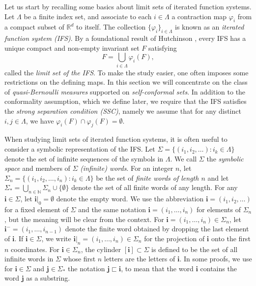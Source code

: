 \documentclass{PRM}
\newcommand{\field}[1]{\mathbb{#1}}
\newcommand{\N}{\field{N}}
\newcommand{\R}{\field{R}}
\theoremstyle{plain}
\theoremstyle{definition}
\theoremstyle{remark}
\begin{document}
Let us start by recalling some basics about limit sets of iterated function systems. Let $\Lambda$ be a finite index set, and associate to each $i\in\Lambda$ a contraction map $\varphi_i$ from a compact subset of $\R^d$ to itself. The collection $\{\varphi_i\}_{i\in\Lambda}$ is known as an \emph{iterated function system (IFS)}. By a foundational result of Hutchinson \cite{H}, every IFS has a unique compact and non-empty invariant set $F$ satisfying
\begin{equation*}
    F=\bigcup_{i\in\Lambda}\varphi_i(F),
\end{equation*}
called the \emph{limit set of the IFS}. To make the study easier, one often imposes some restrictions on the defining maps. In this section we will concentrate on the class of \emph{quasi-Bernoulli measures} supported on \emph{self-conformal sets}. In addition to the conformality assumption, which we define later, we require that the IFS satisfies the \emph{strong separation condition (SSC)}, namely we assume that for any distinct $i,j\in\Lambda$, we have $\varphi_i(F)\cap \varphi_j(F)=\emptyset$.

When studying limit sets of iterated function systems, it is often useful to consider a symbolic representation of the IFS. Let $\Sigma=\{(i_1,i_2,\ldots)\colon i_k\in\Lambda\}$ denote the set of infinite sequences of the symbols in $\Lambda$. We call $\Sigma$ the \emph{symbolic space} and members of $\Sigma$ \emph{(infinite) words}. For an integer $n$, let $\Sigma_n=\{(i_1,i_2,\ldots,i_n)\colon i_k\in\Lambda\}$ be the set of \emph{finite words of length $n$} and let $\Sigma_*=\bigcup_{n\in\N}\Sigma_n\cup\{\emptyset\}$ denote the set of all finite words of any length. For any $\mathbf{i}\in\Sigma$, let $\mathbf{i}|_0=\emptyset$ denote the empty word. We use the abbreviation $\mathbf{i}=(i_1,i_2,\ldots)$ for a fixed element of $\Sigma$ and the same notation $\mathbf{i}=(i_1,\ldots,i_n)$ for elements of $\Sigma_n$, but the meaning will be clear from the context. For $\mathbf{i}=(i_1,\ldots,i_n)\in\Sigma_n$, let $\mathbf{i}^-=(i_1,\ldots,i_{n-1})$ denote the finite word obtained by dropping the last element of $\mathbf{i}$. If $\mathbf{i}\in\Sigma$, we write $\mathbf{i}|_n=(i_1,\ldots,i_n)\in\Sigma_n$ for the projection of $\mathbf{i}$ onto the first $n$ coordinates. For $\mathbf{i}\in\Sigma_n$, the cylinder $[\mathbf{i}]\subset \Sigma$ is defined to be the set of all infinite words in $\Sigma$ whose first $n$ letters are the letters of $\mathbf{i}$. In some proofs, we use for $\mathbf{i}\in\Sigma$ and $\mathbf{j}\in\Sigma_*$ the notation $\mathbf{j}\sqsubset\mathbf{i} $, to mean that the word $\mathbf{i}$ contains the word $\mathbf{j}$ as a substring.
\end{document}
